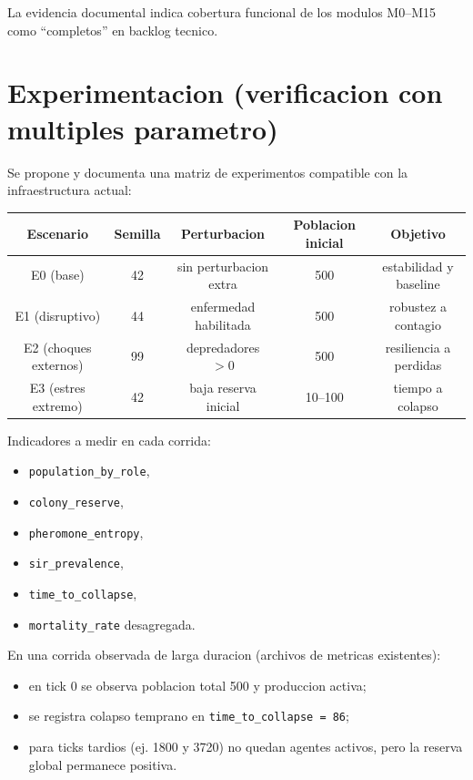\documentclass[11pt]{article}
\begin{document}
La evidencia documental indica cobertura funcional de los modulos M0--M15 como ``completos'' en backlog tecnico.

\section*{Experimentacion (verificacion con multiples parametro)}

Se propone y documenta una matriz de experimentos compatible con la infraestructura actual:

\begin{center}
\begin{tabular}{|c|c|c|c|c|}
\hline
Escenario & Semilla & Perturbacion & Poblacion inicial & Objetivo \\
\hline
E0 (base) & 42 & sin perturbacion extra & 500 & estabilidad y baseline \\
E1 (disruptivo) & 44 & enfermedad habilitada & 500 & robustez a contagio \\
E2 (choques externos) & 99 & depredadores $>0$ & 500 & resiliencia a perdidas \\
E3 (estres extremo) & 42 & baja reserva inicial & 10--100 & tiempo a colapso \\
\hline
\end{tabular}
\end{center}

Indicadores a medir en cada corrida:

\begin{itemize}
  \item \texttt{population\_by\_role},
  \item \texttt{colony\_reserve},
  \item \texttt{pheromone\_entropy},
  \item \texttt{sir\_prevalence},
  \item \texttt{time\_to\_collapse},
  \item \texttt{mortality\_rate} desagregada.
\end{itemize}

En una corrida observada de larga duracion (archivos de metricas existentes):

\begin{itemize}
  \item en tick 0 se observa poblacion total 500 y produccion activa;
  \item se registra colapso temprano en \texttt{time\_to\_collapse = 86};
  \item para ticks tardios (ej. 1800 y 3720) no quedan agentes activos, pero la reserva global permanece positiva.
\end{itemize}
\end{document}
